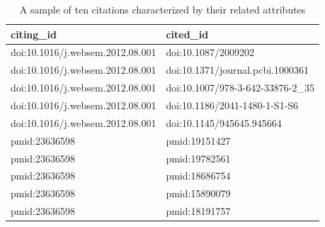 \documentclass{article}
\begin{document}
\begin{table}[ht]
\centering
\caption{A sample of ten citations characterized by their related attributes}
\label{citations_csv}
\begin{tabular}{ll}
\hline
\textbf{citing\_id} & \textbf{cited\_id} \\ \hline
doi:10.1016/j.websem.2012.08.001 & doi:10.1087/2009202 \\ \hline
doi:10.1016/j.websem.2012.08.001 & doi:10.1371/journal.pcbi.1000361 \\ \hline
doi:10.1016/j.websem.2012.08.001 & doi:10.1007/978-3-642-33876-2\_35 \\ \hline
doi:10.1016/j.websem.2012.08.001 & doi:10.1186/2041-1480-1-S1-S6 \\ \hline
doi:10.1016/j.websem.2012.08.001 & doi:10.1145/945645.945664 \\ \hline
pmid:23636598 & pmid:19151427 \\ \hline
pmid:23636598 & pmid:19782561 \\ \hline
pmid:23636598 & pmid:18686754 \\ \hline
pmid:23636598 & pmid:15890079 \\ \hline
pmid:23636598 & pmid:18191757 \\ \hline
\end{tabular}
\end{table}
\end{document}
